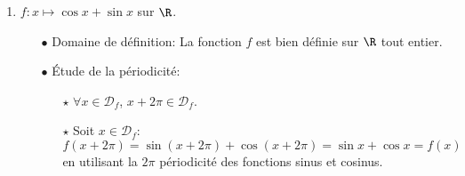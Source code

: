 \begin{correction}
\begin{enumerate}
%
\item $f: x\mapsto \cos{x}+\sin{x}$ sur $\R$.
\begin{itemize}
\item[$\bullet$] Domaine de d\'efinition: La fonction $f$ est bien d\'efinie sur $\R$ tout entier. 
\item[$\bullet$] \'Etude de la p\'eriodicit\'e: 
\begin{itemize}
\item[$\star$] $\forall x\in\mathcal{D}_f$, $x+2\pi\in\mathcal{D}_f$. 
\item[$\star$] Soit $x\in\mathcal{D}_f$: $f(x+2\pi)=\sin{(x+2\pi)}+\cos{(x+2\pi)}=\sin{x}+\cos{x}=f(x)$ en utilisant la $2\pi$ p\'eriodicit\'e des fonctions sinus et cosinus.

\end{itemize}
\end{itemize}
\end{enumerate}
\end{correction}
